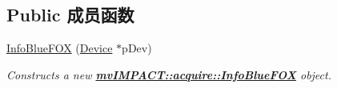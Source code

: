 \subsection*{Public 成员函数}
\begin{DoxyCompactItemize}
\item 
\hyperlink{classmv_i_m_p_a_c_t_1_1acquire_1_1_info_blue_f_o_x_a1adc3c7014728a039f0956cbb3cede81}{Info\+Blue\+F\+O\+X} (\hyperlink{classmv_i_m_p_a_c_t_1_1acquire_1_1_device}{Device} $\ast$p\+Dev)
\begin{DoxyCompactList}\small\item\em Constructs a new {\bfseries \hyperlink{classmv_i_m_p_a_c_t_1_1acquire_1_1_info_blue_f_o_x}{mv\+I\+M\+P\+A\+C\+T\+::acquire\+::\+Info\+Blue\+F\+O\+X}} object. \end{DoxyCompactList}\end{DoxyCompactItemize}
